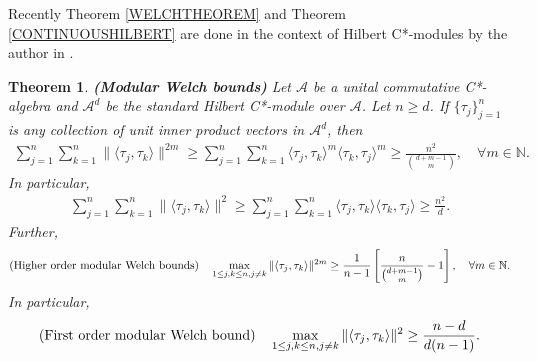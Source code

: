 \documentclass{amsart}
\newtheorem{theorem}{Theorem}[section]
\begin{document}
Recently Theorem  \ref{WELCHTHEOREM}  and Theorem \ref{CONTINUOUSHILBERT}   are done in the context of Hilbert C*-modules by the author in \cite{MAHESHKRISHNA2}.
\begin{theorem}\cite{MAHESHKRISHNA2}
\textbf{(Modular Welch bounds)}
Let $\mathcal{A}$ be a unital commutative C*-algebra and $\mathcal{A}^d$ be the standard Hilbert C*-module over  $\mathcal{A}$.  Let $n\geq d$. If 	$\{\tau_j\}_{j=1}^n$ is any collection of unit inner product  vectors in $\mathcal{A}^d$, then 
\begin{align*}
	\sum_{j=1}^n\sum_{k=1}^n\|\langle \tau_j, \tau_k\rangle \|^{2m}	\geq \sum_{j=1}^n\sum_{k=1}^n\langle \tau_j, \tau_k\rangle ^{m}\langle \tau_k, \tau_j\rangle ^{m}\geq \frac{n^2}{{d+m-1\choose m}}, \quad \forall m \in \mathbb{N}.
\end{align*}
In particular,
\begin{align*}
	\sum_{j=1}^n\sum_{k=1}^n\|\langle \tau_j, \tau_k\rangle \|^{2} \geq 	\sum_{j=1}^n\sum_{k=1}^n\langle \tau_j, \tau_k\rangle \langle \tau_k, \tau_j\rangle \geq \frac{n^2}{{d}}.
\end{align*}
Further, 
\begin{align*}
	\text{(\textbf{Higher order modular Welch bounds})}	\quad		\max _{1\leq j,k \leq n, j\neq k}\|\langle \tau_j, \tau_k\rangle \|^{2m}\geq \frac{1}{n-1}\left[\frac{n}{{d+m-1\choose m}}-1\right], \quad \forall m \in \mathbb{N}.
\end{align*}
In particular,
\begin{align*}
	\text{(\textbf{First order modular Welch bound})}\quad 	\max _{1\leq j,k \leq n, j\neq k}\|\langle \tau_j, \tau_k\rangle \|^{2}\geq\frac{n-d}{d(n-1)}.
\end{align*}	
\end{theorem}
\end{document}
